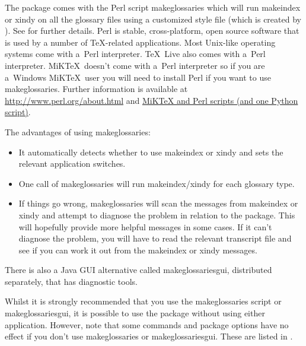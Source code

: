 \documentclass[report,inlinetitle]{nlctdoc}
\begin{document}
The  package comes with the Perl script
\gls{makeglossaries} which will run \gls{makeindex} or \gls{xindy}
on all the glossary files using a customized style file (which is
created by ). See
 for further
details. Perl is stable, cross-platform, open source software that
is used by a number of \TeX-related applications. Most Unix-like
operating systems come with a~Perl interpreter. \TeX~Live also comes
with a~Perl interpreter. MiK\TeX\ doesn't come with a~Perl
interpreter so if you are a~Windows MiK\TeX\ user you will need to
install Perl if you want to use \gls{makeglossaries}.
Further information is available at \url{http://www.perl.org/about.html}
and
\href{http://tex.stackexchange.com/questions/158796/miktex-and-perl-scripts-and-one-python-script}{MiKTeX and Perl scripts (and one Python script)}.

The advantages of using \gls*{makeglossaries}:
\begin{itemize}
\item It automatically detects whether to use \gls*{makeindex} or
\gls*{xindy} and sets the relevant application switches.

\item One call of \gls*{makeglossaries} will run 
\gls*{makeindex}\slash\gls*{xindy} for each glossary type.

\item If things go wrong, \gls{makeglossaries} will scan the
messages from \gls{makeindex} or \gls{xindy} and attempt to diagnose
the problem in relation to the  package. This
will hopefully provide more helpful messages in some cases. If it
can't diagnose the problem, you will have to read the relevant transcript
file and see if you can work it out from the \gls*{makeindex} or
\gls*{xindy} messages.

\end{itemize}

There is also a Java GUI alternative called \gls{makeglossariesgui},
distributed separately, that has diagnostic tools.

Whilst it is strongly recommended that you use the
\gls{makeglossaries} script or \gls{makeglossariesgui}, it is
possible to use the  package without using either
application. However, note that some commands and package options
have no effect if you don't use \gls*{makeglossaries} or
\gls*{makeglossariesgui}. These are listed in
.
\end{document}
